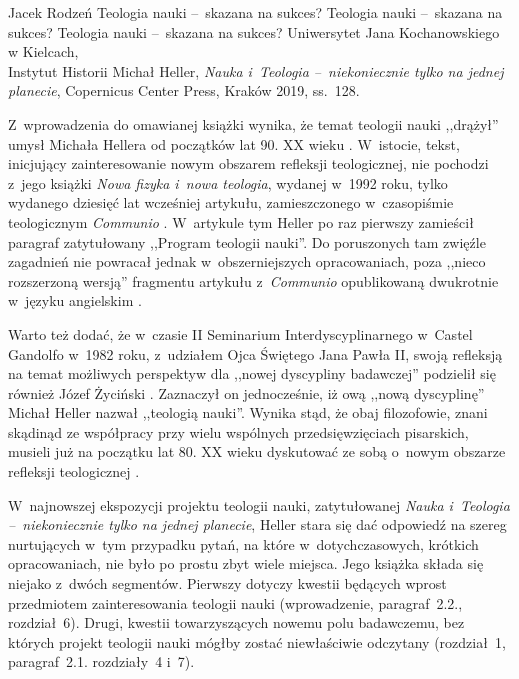 \begin{newrevplenv}{Jacek Rodzeń}
	{Teologia nauki --~skazana na sukces?}
	{Teologia nauki --~skazana na sukces?}
	{Teologia nauki --~skazana na sukces?}
	{Uniwersytet Jana Kochanowskiego w Kielcach,\\
	Instytut Historii}
	{Michał Heller, \textit{Nauka i~Teologia --~niekoniecznie tylko na jednej planecie}, Copernicus Center Press, Kraków 2019, ss.~128.\label{rodzen_anfang}}





\lettrine[loversize=0.13,lines=2,lraise=-0.03,nindent=0em,findent=0.2pt]%
{Z}{}~wprowadzenia do omawianej książki wynika, że temat teologii nauki ,,drążył'' umysł Michała Hellera od początków lat 90. XX wieku
\parencite[][s.~8]{heller_nauka_2019}. %
 W~istocie, tekst, inicjujący zainteresowanie nowym obszarem refleksji teologicznej, nie pochodzi z~jego książki \textit{Nowa fizyka i~nowa teologia}, wydanej w~1992 roku, tylko wydanego dziesięć lat wcześniej artykułu, zamieszczonego w~czasopiśmie teologicznym \textit{Communio}
\parencite[][]{heller_stworzenie_1982}. %
 W~artykule tym Heller po raz pierwszy zamieścił paragraf zatytułowany ,,Program teologii nauki''. Do poruszonych tam zwięźle zagadnień nie powracał jednak w~obszerniejszych opracowaniach, poza ,,nieco rozszerzoną wersją'' 
\parencite[][s.~8]{heller_nauka_2019} %
 fragmentu artykułu z~\textit{Communio} opublikowaną dwukrotnie w~języku angielskim 
\parencite[][]{heller_program_2003}.%


Warto też dodać, że w~czasie II Seminarium Interdyscyplinarnego w~Castel Gandolfo w~1982 roku, z~udziałem Ojca Świętego Jana Pawła II, swoją refleksją na temat możliwych perspektyw dla ,,nowej dyscypliny badawczej'' podzielił się również Józef Życiński
\parencite*[][]{zycinski_w_1984}. %
 Zaznaczył on jednocześnie, iż ową ,,nową dyscyplinę'' Michał Heller nazwał ,,teologią nauki''. Wynika stąd, że obaj filozofowie, znani skądinąd ze współpracy przy wielu wspólnych przedsięwzięciach pisarskich, musieli już na początku lat 80. XX wieku dyskutować ze sobą o~nowym obszarze refleksji teologicznej 
\parencite[więcej na ten temat zob.][]{polak_teologia_2015}.%


W~najnowszej ekspozycji projektu teologii nauki, zatytułowanej \textit{Nauka i~Teologia --~niekoniecznie tylko na jednej planecie}, Heller stara się dać odpowiedź na szereg nurtujących w~tym przypadku pytań, na które w~dotychczasowych, krótkich opracowaniach, nie było po prostu zbyt wiele miejsca. Jego książka składa się niejako z~dwóch segmentów. Pierwszy dotyczy kwestii będących wprost przedmiotem zainteresowania teologii nauki (wprowadzenie, paragraf~2.2., rozdział~6). Drugi, kwestii towarzyszących nowemu polu badawczemu, bez których projekt teologii nauki mógłby zostać niewłaściwie odczytany (rozdział~1, paragraf~2.1. rozdziały~4 i~7).


\end{newrevplenv}

